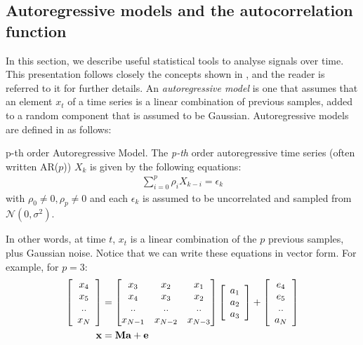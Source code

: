 \documentclass[../main.tex]{subfiles}
\begin{document}
\subsection{Autoregressive models and the autocorrelation function} \label{subsection_autoregression}
In this section, we describe useful statistical tools to analyse signals over time. This presentation follows closely the concepts shown in \cite{Roberts2014}, and the reader is referred to it for further details. An \emph{autoregressive model} is one that assumes that an element $x_t$ of a time series is a linear combination of previous samples, added to a random component that is assumed to be Gaussian. Autoregressive models are defined in \cite{Johnston} as follows:
\begin{definition}{p-th order Autoregressive Model.} \label{def_ar}
The \emph{p-th} order autoregressive time series (often written AR($p$)) $X_k$ is given by the following equations:
\begin{align*}
\sum_{i=0}^p{\rho_iX_{k-i}} = \epsilon_k
\end{align*}
with $\rho_0 \neq 0, \rho_p \neq 0$ and each $\epsilon_k$ is assumed to be uncorrelated and sampled from $\mathcal{N}(0, \sigma^2)$.
\end{definition}
\par In other words, at time $t$, $x_t$ is a linear combination of the $p$ previous samples, plus Gaussian noise. Notice that we can write these equations in vector form. For example, for $p=3$:
\begin{align*}
\left[ \begin{array}{c} x_4 \\ x_5 \\ .. \\ x_N  \end{array} \right] &= \begin{bmatrix} x_3 & x_2 & x_1 \\ x_4 & x_3 & x_2 \\ .. & .. & .. \\ x_{N-1} & x_{N-2} & x_{N-3} \end{bmatrix} \left[ \begin{array}{c} a_1 \\ a_2 \\ a_3 \end{array} \right] + \left[ \begin{array}{c} e_4 \\ e_5 \\ .. \\ a_N \end{array}
\right]\\
\mathbf{x} &= \mathbf{Ma} + \mathbf{e}
\end{align*}
\end{document}
